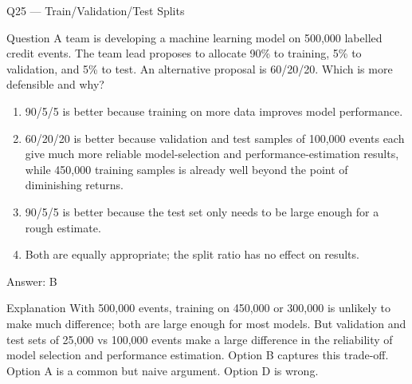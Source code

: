 \documentclass[aspectratio=169,8pt]{beamer}
\begin{document}
	\begin{frame}{Q25 --- Train/Validation/Test Splits}
		\begin{block}{Question}
			A team is developing a machine learning model on 500,000 labelled credit events. The team lead proposes to allocate 90\% to training, 5\% to validation, and 5\% to test. An alternative proposal is 60/20/20. Which is more defensible and why?
		\end{block}
		\begin{enumerate}
			\item 90/5/5 is better because training on more data improves model performance.
			\item 60/20/20 is better because validation and test samples of 100,000 events each give much more reliable model-selection and performance-estimation results, while 450,000 training samples is already well beyond the point of diminishing returns.
			\item 90/5/5 is better because the test set only needs to be large enough for a rough estimate.
			\item Both are equally appropriate; the split ratio has no effect on results.
		\end{enumerate}
		\begin{exampleblock}{Answer: B}\end{exampleblock}
		\begin{block}{Explanation}
			With 500,000 events, training on 450,000 or 300,000 is unlikely to make much difference; both are large enough for most models. But validation and test sets of 25,000 vs 100,000 events make a large difference in the reliability of model selection and performance estimation. Option B captures this trade-off. Option A is a common but naive argument. Option D is wrong.
		\end{block}
	\end{frame}
	
\end{document}
